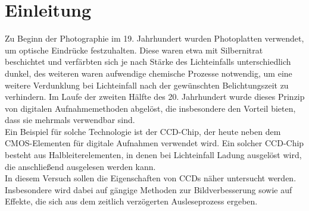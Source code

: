 \section{Einleitung}
Zu Beginn der Photographie im 19. Jahrhundert wurden Photoplatten verwendet, um optische Eindrücke festzuhalten. Diese waren etwa mit Silbernitrat beschichtet und verfärbten sich je nach Stärke des Lichteinfalls unterschiedlich dunkel, des weiteren waren aufwendige chemische Prozesse notwendig, um eine weitere Verdunklung bei Lichteinfall nach der gewünschten Belichtungszeit zu verhindern. Im Laufe der zweiten Hälfte des 20. Jahrhundert wurde dieses Prinzip von digitalen Aufnahmemethoden abgelöst, die insbesondere den Vorteil bieten, dass sie mehrmals verwendbar sind. \\
Ein Beispiel für solche Technologie ist der CCD-Chip, der heute neben dem CMOS-Elementen für digitale Aufnahmen verwendet wird. Ein solcher CCD-Chip besteht aus Halbleiterelementen, in denen bei Lichteinfall Ladung ausgelöst wird, die anschließend ausgelesen werden kann. \\
In diesem Versuch sollen die Eigenschaften von CCDs näher untersucht werden. Insbesondere wird dabei auf gängige Methoden zur Bildverbesserung sowie auf Effekte, die sich aus dem zeitlich verzögerten Ausleseprozess ergeben. 